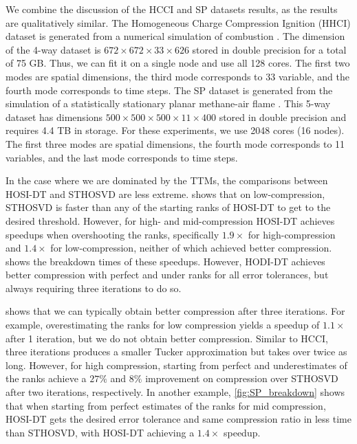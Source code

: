         We combine the discussion of the HCCI and SP datasets results, as the results are qualitatively similar. The Homogeneous Charge Compression Ignition (HHCI)
        dataset is generated from a numerical simulation of combustion
        \cite{BCL14}. The dimension of the 4-way dataset is $672\times 672\times
        33\times 626$ stored in double precision for a total of 75 GB. Thus, we
        can fit it on a single node and use all 128 cores. The first
        two modes are spatial dimensions, the third mode corresponds to 33
        variable, and the fourth mode corresponds to time steps. 
        The SP dataset is generated from the simulation of a statistically
        stationary planar methane-air flame \cite{KZCS16}. This 5-way dataset has
        dimensions $500\times 500\times 500\times 11\times 400$ stored in double
        precision and requires 4.4 TB in storage.
        For these experiments, we use 2048 cores (16 nodes). 
        The first three modes are spatial dimensions, the fourth mode
        corresponds to 11 variables, and the last mode corresponds to time steps.

        In the case where we are dominated by the TTMs, the comparisons between
        HOSI-DT and STHOSVD are less extreme.  shows that on
        low-compression, STHOSVD is faster than any of the starting ranks of
        HOSI-DT to get to the desired threshold. However, for high- and
        mid-compression HOSI-DT achieves speedups when overshooting the ranks,
        specifically $1.9\times$ for high-compression and $1.4\times$ for
        low-compression, neither of which achieved better compression.
         shows the breakdown times of these speedups.
        However, HODI-DT achieves better compression with perfect and under
        ranks for all error tolerances, but always requiring three iterations to
        do so. 
        
         shows that we can typically obtain better compression
        after three iterations. For example, overestimating the ranks for low
        compression yields a speedup of $1.1\times$ after 1 iteration, but we do
        not obtain better compression. Similar to HCCI, three iterations
        produces a smaller Tucker approximation but takes over twice as long.
        However, for high compression, starting from perfect and underestimates
        of the ranks achieve a $27\%$ and $8\%$ improvement on compression over
        STHOSVD after two iterations, respectively. In another example,
        \cref{fig:SP_breakdown} shows that when starting from perfect estimates
        of the ranks for mid compression, HOSI-DT gets the desired error
        tolerance and same compression ratio in less time than STHOSVD, with
        HOSI-DT achieving a $1.4\times$ speedup.
        

